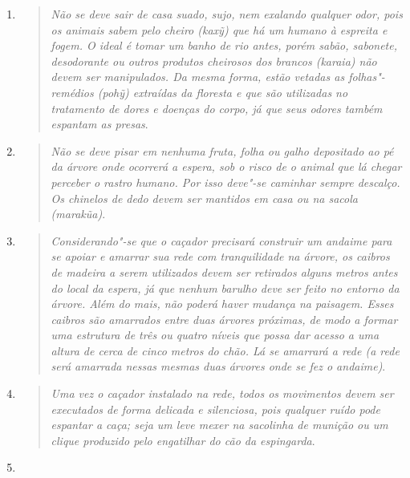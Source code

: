 \begin{enumerate}
\def\labelenumi{\arabic{enumi}.}
\item
\begin{quote}
  \emph{Não se deve sair de casa suado, sujo, nem exalando qualquer odor, pois
    os animais sabem pelo cheiro (\emph{kaxỹ}) que há um humano à espreita
    e fogem. O ideal é tomar um banho de rio antes, porém sabão, sabonete,
    desodorante ou outros produtos cheirosos dos brancos (\emph{karaia})
    não devem ser manipulados. Da mesma forma, estão vetadas as
    folhas"-remédios (\emph{pohỹ}) extraídas da floresta e que são
    utilizadas no tratamento de dores e doenças do corpo, já que seus
    odores também espantam as presas}.
    \end{quote}
\item
\begin{quote}
  \emph{Não se deve pisar em nenhuma fruta, folha ou galho depositado ao pé da
    árvore onde ocorrerá a espera, sob o risco de o animal que lá chegar
    perceber o rastro humano. Por isso deve"-se caminhar sempre descalço.
    Os chinelos de dedo devem ser mantidos em casa ou na sacola
    (\emph{marakũa})}.
    \end{quote}
\item
\begin{quote}
  \emph{Considerando"-se que o caçador precisará construir um andaime para se
    \emph{apo}iar e amarrar sua rede com tranquilidade na árvore, os
    caibros de madeira a serem utilizados devem ser retirados alguns
    metros antes do local da espera, já que nenhum barulho deve ser feito
    no entorno da árvore. Além do mais, não poderá haver mudança na
    paisagem. Esses caibros são amarrados entre duas árvores próximas, de
    modo a formar uma estrutura de três ou quatro níveis que possa dar
    acesso a uma altura de cerca de cinco metros do chão. Lá se amarrará a
    rede (a rede será amarrada nessas mesmas duas árvores onde se fez o
    andaime)}.
    \end{quote}
\item
\begin{quote}
  \emph{Uma vez o caçador instalado na rede, todos os movimentos devem ser
    executados de forma delicada e silenciosa, pois qualquer ruído pode
    espantar a caça; seja um leve mexer na sacolinha de munição ou um
    \emph{clique} produzido pelo engatilhar do cão da espingarda}.
    \end{quote}
\item
\begin{quote}

\end{quote}
\end{enumerate}

